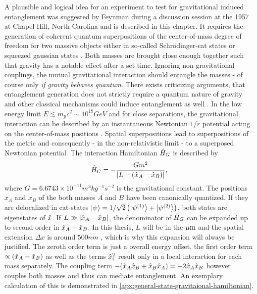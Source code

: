 A plausible and logical idea for an experiment to test for gravitational induced entanglement was suggested by Feynman during a discussion session at the 1957  at Chapel Hill, North Carolina \cite[p. 247-260]{Rickles_2011} and is described in this chapter.
It requires the generation of coherent quantum superpositions of the center-of-mass degree of freedom for two massive objects either in so-called Schrödinger-cat states or squeezed gaussian states \cite{Bose_2017, Pedernales_2023}.
Both masses are brought close enough together such that gravity has a notable effect after a set time.
Ignoring non-gravitational couplings, the mutual gravitational interaction should entangle the masses - of course only \textit{if gravity behaves quantum}.
There exists criticizing arguments, that entanglement generation does not strictly require a quantum nature of gravity and other classical mechanisms could induce entanglement as well \cite{Reginatto_2019}.
In the low energy limit $E\lesssim m_p c^2 \sim 10^{19}\si{GeV}$ and for close separations, the gravitational interaction can be described by an instantaneous Newtonian $1/r$ potential acting on the center-of-mass positions \cite{Carney_2018,Pedernales_2023,Christodoulou_2022}.
Spatial superpositions lead to superpositions of the metric and consequently - in the non-relativistic limit - to a superposed Newtonian potential.
The interaction Hamiltonian $\hat{H}_G$ is described by
\begin{equation}\label{eq:2:gravity-hamiltonian}
  \hat{H}_G = - \frac{Gm^2}{\left\lvert L - (\hat{x}_A - \hat{x}_B)\right\rvert} ,
\end{equation}
where $G=6.6743 \times 10^{-11} \si{m^3 kg^{-1} s^{-2}}$ is the gravitational constant. 
The positions $x_A$ and $x_B$ of the both masses $A$ and $B$ have been canonically quantized. If they are delocalized in cat-states $\ket{\psi} = 1/\sqrt{2}\left(\ket{\psi^{(1)}} + \ket{\psi^{(2)}}\right)$, both states are eigenstates of $\hat{x}$.
If $L \gg \left\lvert\hat{x}_A - \hat{x}_B\right\rvert$, the denominator of $\hat{H}_G$ can be expanded up to second order in $\hat{x}_A - \hat{x}_B$. In this thesis, $L$ will be in the $\mathrm{\mu m}$ and the spatial extension $\Delta x$ is around $500\si{nm}$ \cite{Fein_2019}, which is why this expansion will always be justified.
The zeroth order term is just a overall energy offset, the first order term $\propto (\hat{x}_A - \hat{x}_B)$ as well as the terms $\hat{x}^2_i$ result only in a local interaction for each mass separately. The coupling term $ - (\hat{x}_A\hat{x}_B + \hat{x}_B\hat{x}_A) = -2\hat{x}_A\hat{x}_B$ however couples both masses and thus can mediate entanglement. An exemplary calculation of this is demonstrated in \cref{apx:general-state-gravitaional-hamiltonian}.

